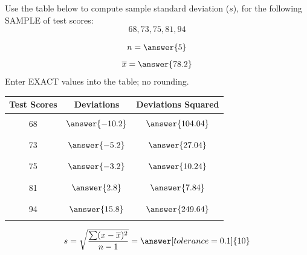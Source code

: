 \documentclass{ximera}
\begin{document}
 
 
 
 
 
 
 
\begin{problem}\label{prob:140hom3prob1}

Use the table below to compute sample standard deviation ($s$), for the following SAMPLE of test scores:
$$68, 73, 75, 81, 94$$

$$n=\answer{5}$$
$$\overline{x}=\answer{78.2}$$
Enter EXACT values into the table; no rounding.
\begin{center}
\begin{tabular}{|c|c|c|}
Test Scores & Deviations & Deviations Squared  \\
 \hline
 \hline
   & &\\
 68 &$\answer{-10.2}$  & $\answer{104.04}$ \\
  & &\\
  \hline
   & &\\
 73 &$\answer{-5.2}$  & $\answer{27.04}$\\
  & &\\
 \hline
  & &\\
 75 &$\answer{-3.2}$ &$\answer{10.24}$ \\
  & &\\
 \hline
  & &\\
 81 &$\answer{2.8}$  &$\answer{7.84}$ \\
  & &\\
 \hline
  & &\\
 94 &$\answer{15.8}$  &$\answer{249.64}$ \\
  & &\\
 \hline
  
\end{tabular}
\end{center}

$$s =\sqrt{\frac{\sum (x-\overline{x})^2}{n-1}}=\answer[tolerance=0.1]{10}$$
 \end{problem}
\end{document}
